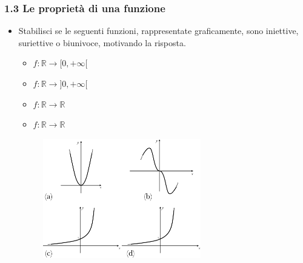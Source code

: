 \subsubsection*{1.3 Le proprietà di una funzione}
\begin{itemize}
  \item[1.6)] Stabilisci se le seguenti funzioni, rappresentate 
graficamente, sono iniettive, suriettive o biunivoce, motivando la risposta.
  \begin{multicols}{2} 
  \begin{itemize}
  \item[(a)] \(f:\mathbb{R}\to[0,+\infty[\)
  \item[(c)] \(f:\mathbb{R}\to]0,+\infty[\)
  \item[(b)] \(f:\mathbb{R}\to\mathbb{R}\)
  \item[(d)] \(f:\mathbb{R}\to\mathbb{R}\)
  \end{itemize}
  \end{multicols}
  
  \begin{figure}[htpb!]
  \centering
  
\includegraphics[width=0.65\textwidth]{img/funz_18.png}%
  \end{figure}
\end{itemize}
